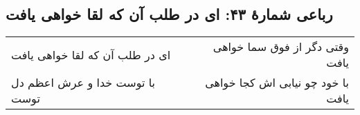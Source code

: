 \begin{center}
\section*{رباعی شمارهٔ ۴۳: ای در طلب آن که لقا خواهی یافت }
\label{sec:043}
\begin{longtable}{l p{0.5cm} r}
ای در طلب آن که لقا خواهی یافت 
&&
وقتی دگر از فوق سما خواهی یافت
\\
با توست خدا و عرش اعظم دل توست
&&
با خود چو نیابی اش کجا خواهی یافت
\\
\end{longtable}
\end{center}

